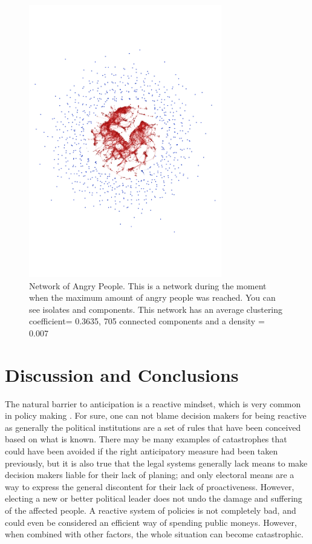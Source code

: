 \documentclass{article}
\begin{document}
\begin{figure}[h]

  \centering
  \includegraphics[trim = 0cm 5cm 0cm 5cm,clip,width=0.75\textwidth]{network}
  \caption[Network of Angry People]{Network of Angry People. This is a network during the moment when the maximum amount of angry people was reached. You can see isolates and  components. This network has an average clustering coefficient= 0.3635, 705 connected components and a density = 0.007}
  \label{network}
\end{figure}



\section{Discussion and Conclusions}

The natural barrier to anticipation is a reactive mindset, which is very common in policy making \cite{torjman_what_2005}. For sure, one can not blame decision makers for being reactive as generally the political institutions are a set of rules that have been conceived based on what is known. There may be many examples of catastrophes that could have been avoided if the right anticipatory measure had been taken previously, but it is also true that the legal systems generally lack means to make decision makers liable for their lack of planing; and  only electoral means are a way to express the general discontent for their lack of proactiveness. However, electing a new or better political leader does not undo the damage and suffering of the affected people. A reactive system of policies is not completely bad, and could even be considered an efficient way of spending public moneys. However, when combined with other factors, the whole situation can become catastrophic. 
\end{document}
